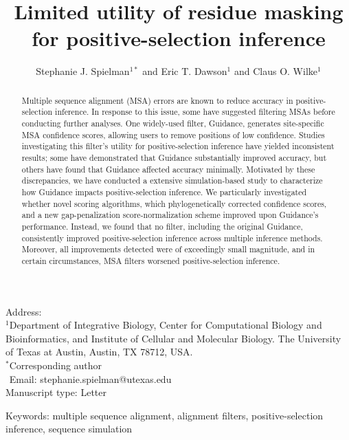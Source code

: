 \documentclass[11pt]{article}
\begin{document}
\title{\textbf{Limited utility of residue masking for positive-selection inference}}
\author{Stephanie J. Spielman$^{1*}$ and Eric T. Dawson$^{1}$ and Claus O. Wilke$^{1}$}
\date{}

\maketitle
\noindent
Address:\\
$^1$Department of Integrative Biology, Center for Computational Biology and Bioinformatics, and Institute of Cellular and Molecular Biology.
The University of Texas at Austin, Austin, TX 78712, USA.\\

\bigskip
\noindent
$^*$Corresponding author\\
$\phantom{^*}$Email: stephanie.spielman@utexas.edu\\

\bigskip
\noindent
Manuscript type: Letter

\bigskip
\noindent Keywords: multiple sequence alignment, alignment filters, positive-selection inference, sequence simulation

\newpage
\begin{abstract}
Multiple sequence alignment (MSA) errors are known to reduce accuracy in positive-selection inference. In response to this issue, some have suggested filtering MSAs before conducting further analyses. One widely-used filter, Guidance, generates site-specific MSA confidence scores, allowing users to remove positions of low confidence. Studies investigating this filter's utility for positive-selection inference have yielded inconsistent results; some have demonstrated that Guidance substantially improved accuracy, but others have found that Guidance affected accuracy minimally. Motivated by these discrepancies, we have conducted a extensive simulation-based study to characterize how Guidance impacts positive-selection inference. We particularly investigated whether novel scoring algorithms, which phylogenetically corrected confidence scores, and a new gap-penalization score-normalization scheme improved upon Guidance's performance. Instead, we found that no filter, including the original Guidance, consistently improved positive-selection inference across multiple inference methods. Moreover, all improvements detected were of exceedingly small magnitude, and in certain circumstances, MSA filters worsened positive-selection inference. %
\end{abstract}
\end{document}

